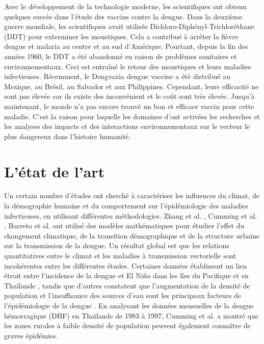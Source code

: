 Avec le développement de la technologie moderne, les scientifiques ont obtenu quelques succès dans l'étude des vaccins contre la dengue. Dans la deuxième guerre mondiale, les scientifiques avait utilisée Dichloro-Diphényl-Trichloréthane (DDT) pour exterminer les moustiques. Cela a contribué à arrêter la fièvre dengue et malaria au centre et au sud d'Amérique. Pourtant, depuis la fin des années 1960, le DDT a été abandonné en raison de problèmes sanitaires et environnementaux. Ceci est entraîné le retour des moustiques et leurs maladies infectieuses. Récemment, le Dengvaxia dengue vaccine a été distribué au Mexique, au Brésil, au Salvador et aux Philippines. Cependant, leurs efficacité ne sont pas élevée car ils existe des inconvénient et le coût sont très élevée. Jusqu'à maintenant, le monde n'a pas encore trouvé un bon et efficace vaccin pour cette maladie. C'est la raison pour laquelle les domaines d'\ep ont activées les recherches et les analyses des impacts et des interactions environnementaux sur le vecteur le plus dangereux dans l'histoire humanité. 

\section{L'\'etat de l'art}
Un certain nombre d'études ont cherché à caractériser les influences du climat, de la démographie humaine et du comportement sur l'épidémiologie des maladies infectieuses, en utilisant différentes méthodologies.  Zhang et al. \cite{zhang2008}, Cumming et al. \cite{cummings2009}, Barreto et al. \cite{barreto2008} ont utilisé des modèles mathématiques pour étudier l'effet du changement climatique, de la transition démographique et de la structure urbaine sur la transmission de la dengue. Un résultat global est que les relations quantitatives entre le climat et les maladies à transmission vectorielle sont incohérentes entre les différentes études. Certaines données établissent un lien étroit entre l'incidence de la dengue et El Ni\~{n}o dans les îles du Pacifique \cite{hales1996,hales1999} et en Thaïlande \cite{cazelles2005}, tandis que d'autres constatent que l'augmentation de la densité de population et l'insuffisance des sources d'eau sont les principaux facteurs de l'épidémiologie de la dengue \cite{teixeira2006,gubler2004}. En analysant les données mensuelles de la dengue hémorragique (DHF) en Thaïlande de 1983 à 1997, Cumming et al. \cite{cummings2004} a montré que les zones rurales à faible densité de population peuvent également connaître de graves épidémies.

